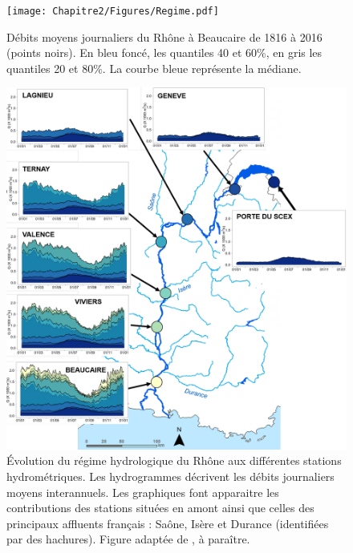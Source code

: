 	\begin{figure}[h!]
	\centering
		\texttt{[image: Chapitre2/Figures/Regime.pdf]}
        \caption{Débits moyens journaliers du Rhône à Beaucaire de 1816 à 2016 (points noirs). En bleu foncé, les quantiles 40 et 60\%, en gris les quantiles 20 et 80\%. La courbe bleue représente la médiane.}	
		\label{fig:Regime}
	\end{figure}
	
	\begin{figure}[h!]
	\centering
		\includegraphics[width=.6\linewidth]{Chapitre2/Figures/RégimeRhône.pdf}
        \caption{Évolution du régime hydrologique du Rhône aux différentes stations hydrométriques. Les hydrogrammes décrivent les débits journaliers moyens interannuels. Les graphiques font apparaitre les contributions des stations situées en amont ainsi que celles des principaux affluents français : Saône, Isère et Durance (identifiées par des hachures). Figure adaptée de \cite{le_coz_flux_nodate}, à paraître.}	
		\label{fig:RegimeAffluents}
	\end{figure}

